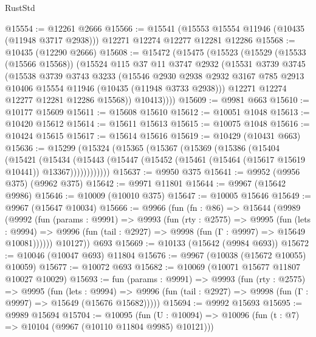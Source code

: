 \begin{lexlean}{RustStd}
\begin{coremodule}
@15554 := @12261 @2666
@15566 := @15541
    (@15553 @15554 @11946 (@10435 (@11948 @3717 @2938)))
    @12271
    @12274
    @12277
    @12281
    @12286
@15568 := @10435 (@12290 @2666)
@15608 := @15472
    (@15475
      (@15523
        (@15529
          (@15533 (@15566 @15568))
          (@15524
            @115
            @37
            @11
            @3747
            @2932
            (@15531
              @3739
              @3745
              (@15538
                @3739
                @3743
                @3233
                (@15546
                  @2930
                  @2938
                  @2932
                  @3167
                  @785
                  @2913
                  @10406
                  @15554
                  @11946
                  (@10435 (@11948 @3733 @2938)))
                @12271
                @12274
                @12277
                @12281
                @12286
                @15568))
            @10413))))
@15609 := @9981 @663
@15610 := @10177 @15609
@15611 := @15608 @15610
@15612 := @10051 @1048
@15613 := @10420 @15612
@15614 := @15611 @15613
@15615 := @10075 @1048
@15616 := @10424 @15615
@15617 := @15614 @15616
@15619 := @10429 (@10431 @663)
@15636 := @15299
    (@15324
      (@15365
        (@15367
          (@15369
            (@15386
              (@15404
                (@15421
                  (@15434
                    (@15443
                      (@15447 (@15452 (@15461 (@15464 (@15617 @15619 @10441)) @13367))))))))))))
@15637 := @9950 @375
@15641 := @9952 (@9956 @375) (@9962 @375)
@15642 := @9971 @11801
@15644 := @9967 (@15642 @9986)
@15646 := @10009 (@10010 @375)
@15647 := @10005 @15646
@15649 := @9967 (@15647 @10034)
@15666 := @9966
    (fun (fn : @86) =>
    @15644
      (@9989
        (@9992
          (fun (params : @9991) =>
          @9993
            (fun (rty : @2575) =>
            @9995
              (fun (lets : @9994) =>
              @9996 (fun (tail : @2927) => @9998 (fun (Γ : @9997) => @15649 @10081))))))
        @10127))
    @693
@15669 := @10133 (@15642 (@9984 @693))
@15672 := @10046 (@10047 @693) @11804
@15676 := @9967 (@10038 (@15672 @10055) @10059)
@15677 := @10072 @693
@15682 := @10069 (@10071 @15677 @11807 @10027 @10029)
@15693 := fun (params : @9991) =>
  @9993
    (fun (rty : @2575) =>
    @9995
      (fun (lets : @9994) =>
      @9996 (fun (tail : @2927) => @9998 (fun (Γ : @9997) => @15649 (@15676 @15682)))))
@15694 := @9992 @15693
@15695 := @9989 @15694
@15704 := @10095
    (fun (U : @10094) => @10096 (fun (t : @7) => @10104 (@9967 (@10110 @11804 @9985) @10121)))

\end{coremodule}
\end{lexlean}
